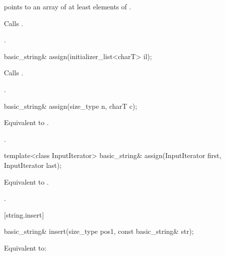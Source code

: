 \begin{itemdescr}
\pnum
\requires {} points to an array of at least 
elements of .

\pnum
\effects Calls .

\pnum
\returns
{}.
\end{itemdescr}

%
\begin{itemdecl}
basic_string& assign(initializer_list<charT> il);
\end{itemdecl}

\begin{itemdescr}
\pnum
\effects Calls .

\pnum
{}.
\end{itemdescr}


%
\begin{itemdecl}
basic_string& assign(size_type n, charT c);
\end{itemdecl}

\begin{itemdescr}
\pnum
\effects Equivalent to .

\pnum
\returns
{}.
\end{itemdescr}

%
\begin{itemdecl}
template<class InputIterator>
  basic_string& assign(InputIterator first, InputIterator last);
\end{itemdecl}

\begin{itemdescr}
\pnum
\effects Equivalent to .

\pnum
\returns
{}.
\end{itemdescr}

[string.insert]{}

%
\begin{itemdecl}
basic_string&
  insert(size_type pos1,
         const basic_string& str);
\end{itemdecl}

\begin{itemdescr}
\pnum
\effects Equivalent to: 
\end{itemdescr}


